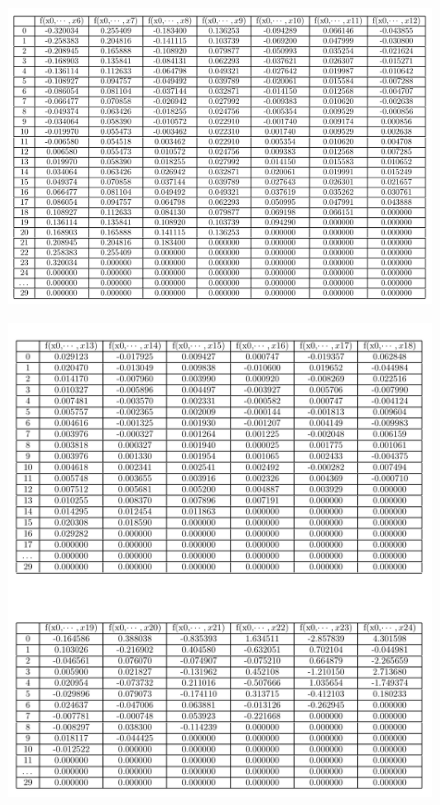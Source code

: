 \documentclass[a4paper, 12pt]{article}
\begin{document}
\begin{figure}[ht]
	\centering
	\includegraphics[width=1\linewidth]{./img/t12.png}
\end{figure}

\begin{figure}[ht]
	\centering
	\includegraphics[width=1\linewidth]{./img/t13-4.png}
\end{figure}
\end{document}
